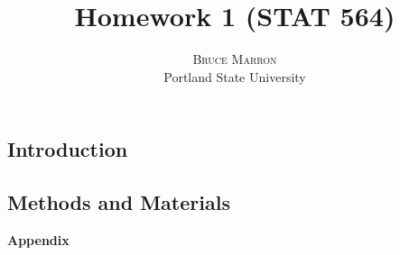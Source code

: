 \documentclass[twoside]{article}	%
\title{\vspace{-15mm}\fontsize{14pt}{10pt}\selectfont\textbf{Homework 1 (STAT 564)}} %
\author{
\large
\textsc{Bruce Marron} \\ %
\normalsize Portland State University \\ %
\vspace{-5mm}
}
\date{}
\begin{document}
\maketitle %
\thispagestyle{fancy} %






\subsection{Introduction}

\subsection{Methods and Materials}


 



\newpage




\newpage
\vspace*{5cm}
\begin{center}
\LARGE \textbf{Appendix}
\end{center}
%
%
\end{document}
